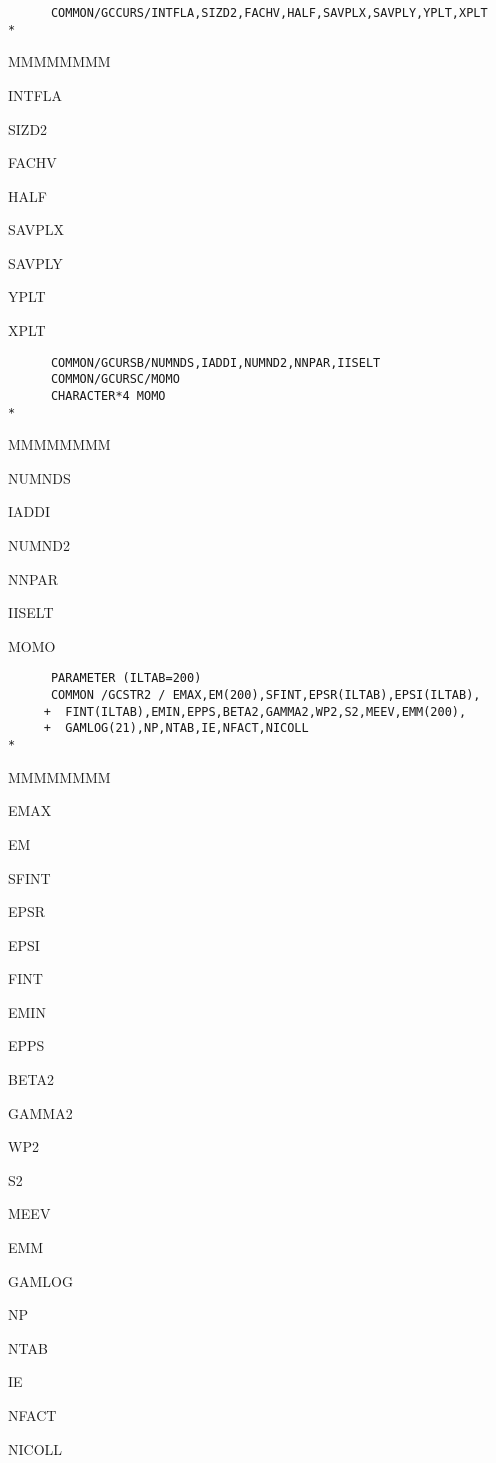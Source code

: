 \begin{verbatim}
      COMMON/GCCURS/INTFLA,SIZD2,FACHV,HALF,SAVPLX,SAVPLY,YPLT,XPLT
*
\end{verbatim}
\begin{DLtt}{MMMMMMMM}
\item[INTFLA]
\item[SIZD2]
\item[FACHV]
\item[HALF]
\item[SAVPLX]
\item[SAVPLY]
\item[YPLT]
\item[XPLT]
\end{DLtt}

\begin{verbatim}
      COMMON/GCURSB/NUMNDS,IADDI,NUMND2,NNPAR,IISELT
      COMMON/GCURSC/MOMO
      CHARACTER*4 MOMO
*
\end{verbatim}
\begin{DLtt}{MMMMMMMM}
\item[NUMNDS]
\item[IADDI]
\item[NUMND2]
\item[NNPAR]
\item[IISELT]
\item[MOMO]
\end{DLtt}

\begin{verbatim}
      PARAMETER (ILTAB=200)
      COMMON /GCSTR2 / EMAX,EM(200),SFINT,EPSR(ILTAB),EPSI(ILTAB),
     +  FINT(ILTAB),EMIN,EPPS,BETA2,GAMMA2,WP2,S2,MEEV,EMM(200),
     +  GAMLOG(21),NP,NTAB,IE,NFACT,NICOLL
*
\end{verbatim}
\begin{DLtt}{MMMMMMMM}
\item[EMAX]
\item[EM]
\item[SFINT]
\item[EPSR]
\item[EPSI]
\item[FINT]
\item[EMIN]
\item[EPPS]
\item[BETA2]
\item[GAMMA2]
\item[WP2]
\item[S2]
\item[MEEV]
\item[EMM]
\item[GAMLOG]
\item[NP]
\item[NTAB]
\item[IE]
\item[NFACT]
\item[NICOLL]
\end{DLtt}


